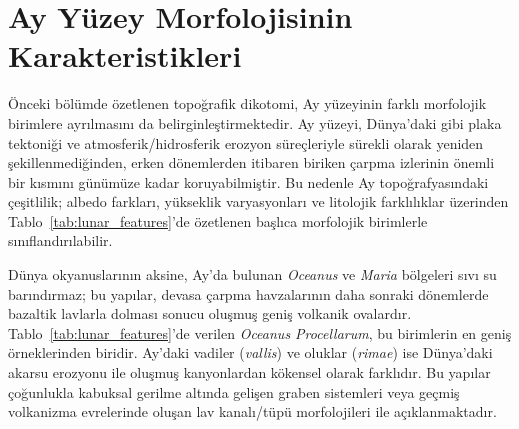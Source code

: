 \section{Ay Yüzey Morfolojisinin Karakteristikleri}\label{sec:lunar_morphology}

Önceki bölümde özetlenen topoğrafik dikotomi, Ay yüzeyinin farklı morfolojik birimlere ayrılmasını da belirginleştirmektedir. Ay yüzeyi, Dünya'daki gibi plaka tektoniği ve atmosferik/hidrosferik erozyon süreçleriyle sürekli olarak yeniden şekillenmediğinden, erken dönemlerden itibaren biriken çarpma izlerinin önemli bir kısmını günümüze kadar koruyabilmiştir. Bu nedenle Ay topoğrafyasındaki çeşitlilik; albedo farkları, yükseklik varyasyonları ve litolojik farklılıklar üzerinden Tablo~\ref{tab:lunar_features}'de özetlenen başlıca morfolojik birimlerle sınıflandırılabilir.

\medskip
Dünya okyanuslarının aksine, Ay'da bulunan \textit{Oceanus} ve \textit{Maria} bölgeleri sıvı su barındırmaz; bu yapılar, devasa çarpma havzalarının daha sonraki dönemlerde bazaltik lavlarla dolması sonucu oluşmuş geniş volkanik ovalardır. Tablo~\ref{tab:lunar_features}'de verilen \textit{Oceanus Procellarum}, bu birimlerin en geniş örneklerinden biridir. Ay'daki vadiler (\textit{vallis}) ve oluklar (\textit{rimae}) ise Dünya'daki akarsu erozyonu ile oluşmuş kanyonlardan kökensel olarak farklıdır. Bu yapılar çoğunlukla kabuksal gerilme altında gelişen graben sistemleri veya geçmiş volkanizma evrelerinde oluşan lav kanalı/tüpü morfolojileri ile açıklanmaktadır.



